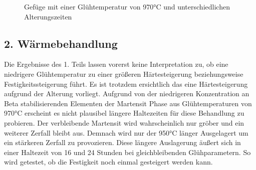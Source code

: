 \documentclass[a4paper, 11pt]{tubsreprt}
\begin{document}
\begin{figure} 		%
    \caption{Gefüge mit einer Glühtemperatur von 970°C und unterschiedlichen Alterungszeiten}
    \label{970 alterung}
\end{figure}



\subsection{2. Wärmebehandlung}
Die Ergebnisse des 1. Teils lassen vorerst keine Interpretation zu, ob eine niedrigere Glühtemperatur zu einer größeren Härtesteigerung beziehungsweise Festigkeitssteigerung führt. Es ist trotzdem ersichtlich das eine Härtesteigerung aufgrund der Alterung vorliegt. Aufgrund von der niedrigeren Konzentration an Beta stabilisierenden Elementen der Martensit Phase aus Glühtemperaturen von 970°C erscheint es nicht plausibel längere Haltezeiten für diese Behandlung zu probieren. Der verbleibende Martensit wird wahrscheinlich nur gröber und ein weiterer Zerfall bleibt aus. Demnach wird nur der 950°C länger Ausgelagert um ein stärkeren Zerfall zu provozieren. Diese längere Auslagerung äußert sich in einer Haltezeit von 16 und 24 Stunden bei gleichbleibenden Glühparametern. So wird getestet, ob die Festigkeit noch einmal gesteigert werden kann.
\end{document}
